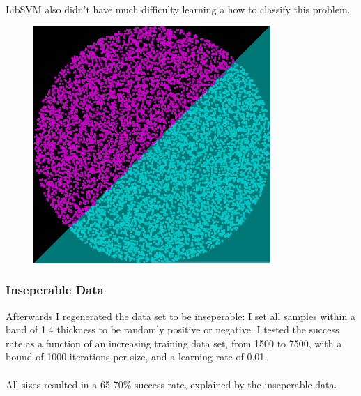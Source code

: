 \documentclass[a4paper]{article}
\begin{document}
\newpage

LibSVM also didn't have much difficulty learning a how to classify this problem.

\begin{figure}[h!]
    \includegraphics[width=0.8\textwidth]{images/svm_seperable.png}
\end{figure}

\newpage

\subsubsection {Inseperable Data}

Afterwards I regenerated the data set to be inseperable:
I set all samples within a band of 1.4 thickness to be randomly positive
or negative. I tested the success rate as a function of an increasing training
data set, from 1500 to 7500, with a bound of 1000 iterations per size,
and a learning rate of 0.01.
\\\\
All sizes resulted in a 65-70\% success rate, explained by the inseperable data.
\end{document}
